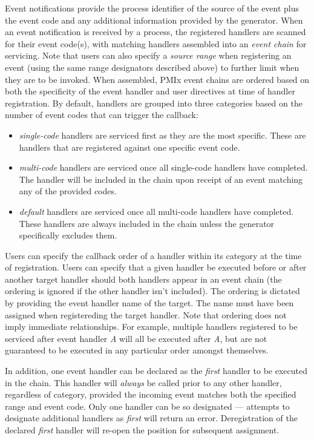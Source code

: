 Event notifications provide the process identifier of the source of the event plus the event code and any additional information provided by the generator. When an event notification is received by a process, the registered handlers are scanned for their event code(s), with matching handlers assembled into an \textit{event chain} for servicing. Note that users can also specify a \textit{source range} when registering an event (using the same range designators described above) to further limit when they are to be invoked. When assembled, PMIx event chains are ordered based on both the specificity of the event handler and user directives at time of handler registration. By default, handlers are grouped into three categories based on the number of event codes that can trigger the callback:
\begin{itemize}
%
\item \textit{single-code} handlers are serviced first as they are the most specific. These are handlers that are registered against one specific event code.
%
\item \textit{multi-code} handlers are serviced once all single-code handlers have completed. The handler will be included in the chain upon receipt of an event matching any of the provided codes.
%
\item \textit{default} handlers are serviced once all multi-code handlers have completed. These handlers are always included in the chain unless the generator specifically excludes them.
%
\end{itemize}

Users can specify the callback order of a handler within its category at the time of registration. 
Users can specify that a given handler be executed before or after another target handler should both handlers appear in an event chain (the ordering is ignored if the other handler isn't included). 
The ordering is dictated by providing the event handler name of the target.  The name must have been assigned when registereding the target handler. 
Note that ordering does not imply immediate relationships. For example, multiple handlers registered to be serviced after event handler \textit{A} will all be executed after \textit{A}, but are not guaranteed to be executed in any particular order amongst themselves.

In addition, one event handler can be declared as the \textit{first} handler to be executed in the chain. This handler will \textit{always} be called prior to any other handler, regardless of category, provided the incoming event matches both the specified range and event code. Only one handler can be so designated --- attempts to designate additional handlers as \textit{first} will return an error. Deregistration of the declared \textit{first} handler will re-open the position for subsequent assignment.

